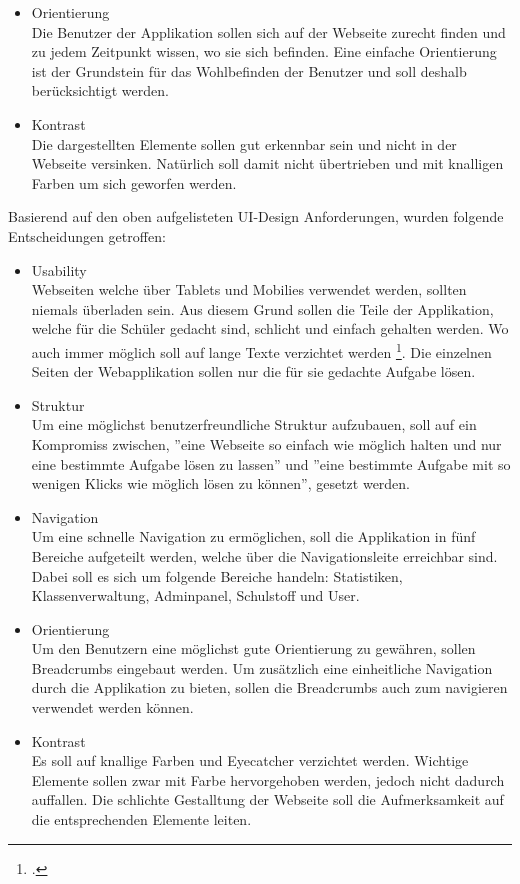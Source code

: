 \begin{itemize}
	\item Orientierung \\
		Die Benutzer der Applikation sollen sich auf der Webseite zurecht finden und zu jedem Zeitpunkt wissen, wo sie sich befinden. Eine einfache Orientierung ist der Grundstein für das Wohlbefinden der Benutzer und soll deshalb berücksichtigt werden.
		
	\item Kontrast \\
		Die dargestellten Elemente sollen gut erkennbar sein und nicht in der Webseite versinken. Natürlich soll damit nicht übertrieben und mit knalligen Farben um sich geworfen werden.
\end{itemize}

Basierend auf den oben aufgelisteten UI-Design Anforderungen, wurden folgende Entscheidungen getroffen:

\begin{itemize}
	\item Usability \\
		Webseiten welche über Tablets und Mobilies verwendet werden, sollten niemals überladen sein. Aus diesem Grund sollen die Teile der Applikation, welche für die Schüler gedacht sind, schlicht und einfach gehalten werden. Wo auch immer möglich soll auf lange Texte verzichtet werden \footcite{usability}. Die einzelnen Seiten der Webapplikation sollen nur die für sie gedachte Aufgabe lösen.
		
	\item Struktur \\
		Um eine möglichst benutzerfreundliche Struktur aufzubauen, soll auf ein Kompromiss zwischen, ''eine Webseite so einfach wie möglich halten und nur eine bestimmte Aufgabe lösen zu lassen'' und ''eine bestimmte Aufgabe mit so wenigen Klicks wie möglich lösen zu können'', gesetzt werden. \\
		
	\item Navigation \\
		Um eine schnelle Navigation zu ermöglichen, soll die Applikation in fünf Bereiche aufgeteilt werden, welche über die Navigationsleite erreichbar sind. Dabei soll es sich um folgende Bereiche handeln: Statistiken, Klassenverwaltung, Adminpanel, Schulstoff und User. 
		
	\item Orientierung \\
		Um den Benutzern eine möglichst gute Orientierung zu gewähren, sollen Breadcrumbs eingebaut werden. Um zusätzlich eine einheitliche Navigation durch die Applikation zu bieten, sollen die Breadcrumbs auch zum navigieren verwendet werden können.
		
	\item Kontrast \\
		Es soll auf knallige Farben und Eye­cat­cher verzichtet werden. Wichtige Elemente sollen zwar mit Farbe hervorgehoben werden, jedoch nicht dadurch auffallen. Die schlichte Gestalltung der Webseite soll die Aufmerksamkeit auf die entsprechenden Elemente leiten.
\end{itemize}


